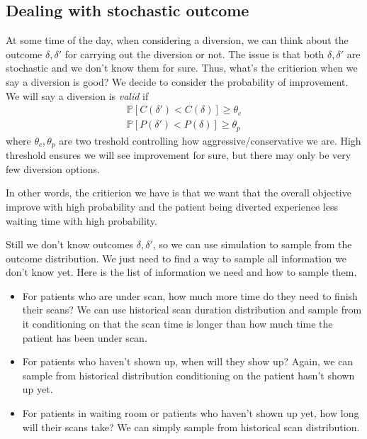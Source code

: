 \subsection{Dealing with stochastic outcome}

At some time of the day, when considering a diversion, we can think about the outcome $\delta, \delta'$ for carrying out the diversion or not. The issue is that both $\delta, \delta'$ are stochastic and we don't know them for sure. Thus, what's the critierion when we say a diversion is good? We decide to consider the probability of improvement. We will say a diversion is \textit{valid} if
\begin{align*}
  \mathbb{P}[C(\delta') < C(\delta)] \ge \theta_c   \\
  \mathbb{P}[P(\delta') < P(\delta)] \ge \theta_p
\end{align*}
where $\theta_c, \theta_p$ are two treshold controlling how aggressive/conservative we are. High threshold ensures we will see improvement for sure, but there may only be very few diversion options.

In other words, the critierion we have is that we want that the overall objective improve with high probability and the patient being diverted experience less waiting time with high probability.

Still we don't know outcomes $\delta, \delta'$, so we can use simulation to sample from the outcome distribution. We just need to find a way to sample all information we don't know yet. Here is the list of information we need and how to sample them.

\begin{itemize}
\item For patients who are under scan, how much more time do they need to finish their scans? We can use historical scan duration distribution and sample from it conditioning on that the scan time is longer than how much time the patient has been under scan.
\item For patients who haven't shown up, when will they show up? Again, we can sample from historical distribution conditioning on the patient hasn't shown up yet.
\item For patients in waiting room or patients who haven't shown up yet, how long will their scans take? We can simply sample from historical scan distribution.
\end{itemize}

